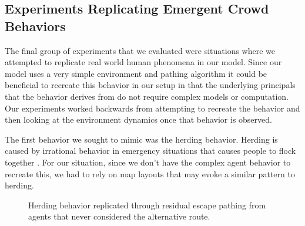 \documentclass[12pt,letterpaper]{article}
\begin{document}
\subsection{Experiments Replicating Emergent Crowd Behaviors} \label{emergentBehavior}

The final group of experiments that we evaluated were situations where we attempted to replicate real world human phenomena in our model.  Since our model uses a very simple environment and pathing algorithm it could be beneficial to recreate this behavior in our setup in that the underlying principals that the behavior derives from do not require complex models or computation.  Our experiments worked backwards from attempting to recreate the behavior and then looking at the environment dynamics once that behavior is observed. 

The first behavior we sought to mimic was the herding behavior.  Herding is caused by irrational behavior in emergency situations that causes people to flock together \cite{almeidaCrowdSimulationModeling2013}.  For our situation, since we don't have the complex agent behavior to recreate this, we had to rely on map layouts that may evoke a similar pattern to herding.

\begin{figure}[!htbp]
  \centering
  \hfill
  \caption{Herding behavior replicated through residual escape pathing from agents that never considered the alternative route.}
\end{figure}
\end{document}
